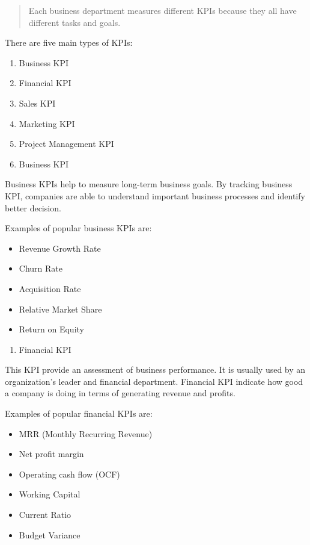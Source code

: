 \documentclass[]{book}
\providecommand{\tightlist}{%
  \setlength{\itemsep}{0pt}\setlength{\parskip}{0pt}}
\begin{document}
\begin{quote}
Each business department measures different KPIs because they all have
different tasks and goals.
\end{quote}

There are five main types of KPIs:

\begin{enumerate}
\def\labelenumi{\arabic{enumi}.}
\item
  Business KPI
\item
  Financial KPI
\item
  Sales KPI
\item
  Marketing KPI
\item
  Project Management KPI
\item
  Business KPI
\end{enumerate}

Business KPIs help to measure long-term business goals. By tracking
business KPI, companies are able to understand important business
processes and identify better decision.

Examples of popular business KPIs are:

\begin{itemize}
\tightlist
\item
  Revenue Growth Rate
\item
  Churn Rate
\item
  Acquisition Rate
\item
  Relative Market Share
\item
  Return on Equity
\end{itemize}

\begin{enumerate}
\def\labelenumi{\arabic{enumi}.}
\setcounter{enumi}{1}
\tightlist
\item
  Financial KPI
\end{enumerate}

This KPI provide an assessment of business performance. It is usually
used by an organization's leader and financial department. Financial KPI
indicate how good a company is doing in terms of generating revenue and
profits.

Examples of popular financial KPIs are:

\begin{itemize}
\tightlist
\item
  MRR (Monthly Recurring Revenue)
\item
  Net profit margin
\item
  Operating cash flow (OCF)
\item
  Working Capital
\item
  Current Ratio
\item
  Budget Variance
\end{itemize}
\end{document}

